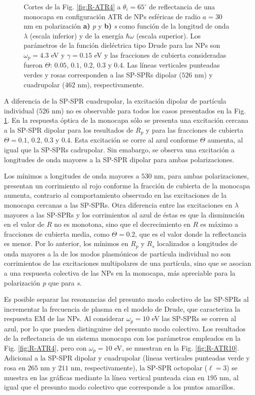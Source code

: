 \begin{figure}[h!]
	\caption{Cortes de la Fig. \ref{fig:R-ATR4} a $\theta_i = 65^\circ$ de reflectancia de una monocapa en configuración ATR de NPs esféricas de radio $a=30$ nm en polarización \textbf{a)} \emph{p} y \textbf{b)} \emph{s} como función de la longitud de onda $\lambda$ (escala inferior) y de la energía $\hbar \omega$ (escala superior). Los parámetros de la función dieléctrica tipo Drude para las NPs son $\omega_p = 4.3$ eV y $\gamma = 0.15$ eV y las fracciones de cubierta consideradas fueron $\Theta$: $0. 05$, $0. 1$, $0. 2$, $0. 3$ y $0. 4$. Las líneas verticales punteadas verdes y rosas corresponden a las SP-SPRs dipolar ($526$ nm) y cuadrupolar ($462$ nm), respectivamente. }\label{fig:R-ATR4-Cuts}
	\end{figure}	
	
    
A diferencia de la SP-SPR cuadrupolar, la excitación dipolar de partícula individual ($526$ nm) no es observable para todos los casos presentados en la Fig. \ref{fig:R-ATR4-Cuts}. En la respuesta óptica de la monocapa sólo se presenta una excitación cercana a la SP-SPR dipolar para los resultados de $R_p$ y para las fracciones de cubierta $\Theta = 0.1,\,0.2,\,0.3$ y $0.4$. Esta excitación se corre al azul conforme $\Theta$ aumenta, al igual que la SP-SPRs cadrupolar. Sin emabargo, se observa una excitación a longitudes de onda mayores a la SP-SPR dipolar para ambas polarizaciones.
 
Los mínimos a longitudes de onda mayores a $530$ nm, para ambas polarizaciones, presentan un corrimiento al rojo conforme la fracción de cubierta de la monocapa aumenta, contrario al comportamiento observado en las excitaciones de la monocapa cercanas a las SP-SPRs. Otra diferencia entre las excitaciones en $\lambda$ mayores a las SP-SPRs y los corrimientos al azul de éstas es que la disminución en el valor de $R$ no es monotona, sino que el decrecimiento en $R$ es máximo a fracciones de cubierta media, como $\Theta=0.2$, que es el valor donde la reflectancia es menor. Por lo anterior, los mínimos en $R_p$ y $R_s$ localizados a longitudes de onda mayores a la de los modos plasmónicos de partícula individual no son corrimientos de las excitaciones multipolares de una partícula, sino que se asocian a una respuesta colectiva de las NPs en la monocapa, más apreciable para la polarización \emph{p} que para \emph{s}.

Es posible separar las resonancias del presunto modo colectivo de las SP-SPRs al incrementar la frecuencia de plasma en el modelo de Drude, que caracteriza la respuesta EM de las NPs. Al considerar $\omega_p = 10$ eV las SP-SPRs se corren al azul, por lo que pueden distinguirse del presunto modo colectivo. Los resultados de la reflectancia de un sistema monocapa con los parámetros empleados en la Fig. \ref{fig:R-ATR4}, pero con $\omega_p = 10$ eV, se muestran en la Fig. \ref{fig:R-ATR10}. Adicional a la SP-SPR dipolar y cuadrupolar (líneas verticales punteadas verde y rosa en $265$ nm y $211$ nm, respectivamente), la SP-SPR octopolar ($\ell = 3$) se muestra en las gráficas mediante la línea vertical punteada cian en $195$ nm, al igual que el presunto modo colectivo que corresponde a los puntos amarillos.
	
